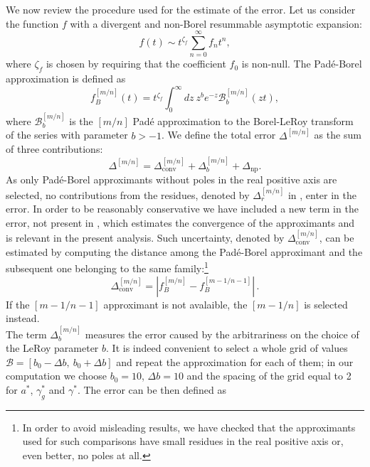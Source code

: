 \documentclass [11pt]{article}
\begin{document}
We now review the procedure used for the estimate of the error. Let us consider the function $f$ with
a divergent and non-Borel resummable asymptotic expansion:
\begin{equation}
f(t)\sim t^{\zeta_f}\sum_{n=0}^\infty f_n t^n,
\label{eqn:10}
\end{equation}
where $\zeta_f$ is chosen by requiring that the coefficient $f_0$ is non-null.  The Pad\'e-Borel approximation is defined as
\begin{equation}
f_B^{[m/n]}(t)=t^{\zeta_f}\int_0^\infty dz\ z^be^{-z}\mathcal{B}_b^{[m/n]}(z t),
\label{eqn:a1}
\end{equation}
where $\mathcal{B}_b^{[m/n]}$ is the $[m/n]$ Pad\'e approximation to the Borel-LeRoy transform of the series with parameter $b>-1$.
We define the total error $\Delta^{[m/n]}$ as the sum of three contributions:
\begin{equation}
\Delta^{[m/n]}=\Delta^{[m/n]}_\mathrm{conv}+\Delta^{[m/n]}_b+\Delta_\mathrm{np}.
\end{equation}
As only Pad\'e-Borel approximants without poles in the real positive axis are selected, no contributions from the residues,  denoted by 
$\Delta_r^{[m/n]}$ in \cite{DiPietro:2020jne},  enter in the error. In order to be reasonably conservative we have included a new term in the error, not present in 
\cite{DiPietro:2020jne}, which estimates the convergence of the approximants and is relevant in the present analysis. Such uncertainty, denoted by $\Delta^{[m/n]}_\mathrm{conv}$, can be estimated by computing the distance among the Pad\'e-Borel approximant and the subsequent one belonging to the same family:\footnote{In order to avoid misleading results, we have checked that the approximants used for such comparisons have small residues in the real positive axis or, even better, no poles at all.}
\begin{equation}
\Delta^{[m/n]}_\mathrm{conv}=\left|f_B^{[m/n]}-f_B^{[m-1/n-1]}\right| \,.
\end{equation}
 If the $[m-1/n-1]$ approximant is not avalaible, the $[m-1/n]$ is selected instead.\\
The term $\Delta^{[m/n]}_b$ measures the error caused by the arbitrariness on the choice of the LeRoy parameter $b$. It is indeed convenient to select a whole grid of values $\mathcal{B}=[b_0-\Delta b,\ b_0+\Delta b]$ and repeat the approximation for each of them; in our computation we choose $b_0=10$, $\Delta b=10$ and the spacing of the grid equal to 2 for $a^*$,  $\gamma_g^*$ and $\gamma^*$. The error can be then defined as
\end{document}
